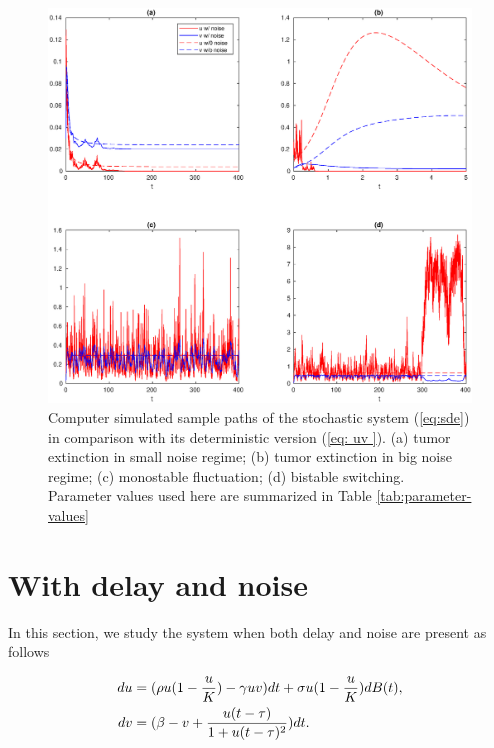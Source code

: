 \documentclass{aims}
\theoremstyle{definition}
\begin{document}
 \begin{figure}
\includegraphics[scale=0.4]{explore/plots/sde-extinction-switch/sde-extinction-switch.eps} 
 \caption{\label{fig:noise}Computer simulated sample paths of the stochastic
 system (\ref{eq:sde}) in comparison with its deterministic version
 (\ref{eq: uv }). (a) tumor extinction in small noise regime; (b)
 tumor extinction in big noise regime; (c) monostable fluctuation;
 (d) bistable switching. Parameter values used here are summarized
 in Table \ref{tab:parameter-values} }
 
 \end{figure}
% 
% 
 \section{With delay and noise}
 
 In this section, we study the system when both delay and noise are
 present as follows
 
 \begin{subequations}\label{eq: sdde}
 \begin{align}
 du & =(\text{\ensuremath{\rho u(1-\frac{u}{K})-\gamma uv)dt+\sigma u(1-\frac{u}{K})dB(t)}},\\
 dv & =(\beta-v+\frac{u(t-\tau)}{1+u(t-\tau)^{2}})dt.
 \end{align}
 \end{subequations}
 
\end{document}
